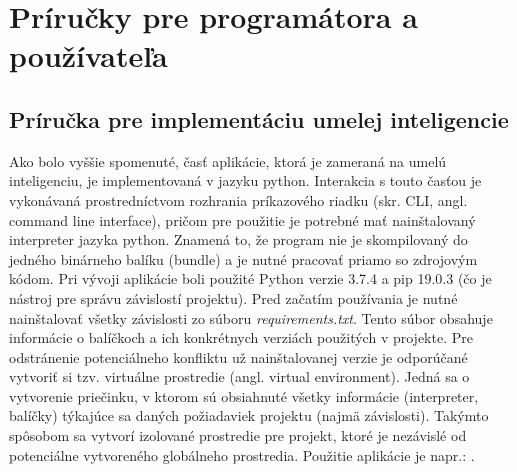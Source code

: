 \section{Príručky pre programátora a používateľa}\label{sec:helpers}
\subsection{Príručka pre implementáciu umelej inteligencie}\label{subsec:helpers-ai}
Ako bolo vyššie spomenuté, časť aplikácie, ktorá je zameraná na umelú inteligenciu, je implementovaná v jazyku python.
Interakcia s touto časťou je vykonávaná prostredníctvom rozhrania príkazového riadku (skr. CLI, angl. command line
interface), pričom pre použitie je potrebné mať nainštalovaný interpreter jazyka python.
Znamená to, že program nie je skompilovaný do jedného binárneho balíku (bundle) a je nutné pracovať priamo so zdrojovým
kódom.
Pri vývoji aplikácie boli použité Python verzie 3.7.4 a pip 19.0.3 (čo je nástroj pre správu závislostí projektu).
Pred začatím používania je nutné nainštalovať všetky závislosti zo súboru \emph{requirements.txt}.
Tento súbor obsahuje informácie o balíčkoch a ich konkrétnych verziách použitých v projekte.
Pre odstránenie potenciálneho konfliktu už nainštalovanej verzie je odporúčané vytvoriť si tzv. virtuálne prostredie
(angl. virtual environment).
Jedná sa o vytvorenie priečinku, v ktorom sú obsiahnuté všetky informácie (interpreter, balíčky) týkajúce sa daných
požiadaviek projektu (najmä závislosti).
Takýmto spôsobom sa vytvorí izolované prostredie pre projekt, ktoré je nezávislé od potenciálne vytvoreného globálneho
prostredia.
Použitie aplikácie je napr.: .

